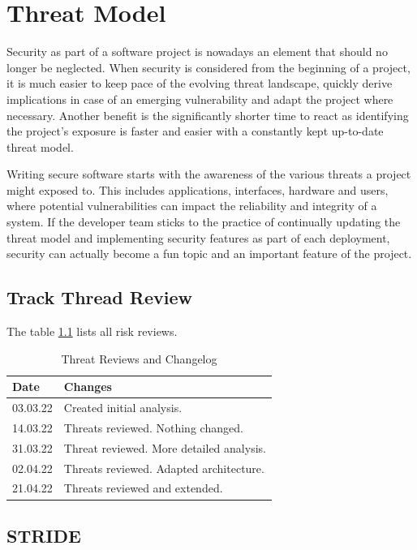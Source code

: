 \chapter{Threat Model}

Security as part of a software project is nowadays an element that should no longer be neglected. When security is considered from the beginning of a project, it is much easier to keep pace of the evolving threat landscape, quickly derive implications in case of an emerging vulnerability and adapt the project where necessary. Another benefit is the significantly shorter time to react as identifying the project's exposure is faster and easier with a constantly kept up-to-date threat model.

Writing secure software starts with the awareness of the various threats a project might exposed to. This includes applications, interfaces, hardware and users, where potential vulnerabilities can impact the reliability and integrity of a system. If the developer team sticks to the practice of continually updating the threat model and implementing security features as part of each deployment, security can actually become a fun topic and an important feature of the project.

\section{Track Thread Review}
The table \ref{tab:threat-review} lists all risk reviews.

\begin{table}[h!]
  \centering
  \caption{\label{tab:threat-review}Threat Reviews and Changelog}
  \begin{tabular}{ | l | l | }
    \hline
    \textbf{Date} & \textbf{Changes} \\
    \hline
    03.03.22 & Created initial analysis. \\
    \hline
    14.03.22 & Threats reviewed. Nothing changed. \\
    \hline
    31.03.22 & Threat reviewed. More detailed analysis. \\
    \hline
    02.04.22 & Threats reviewed. Adapted architecture.\\
    \hline
    21.04.22 & Threats reviewed and extended.\\
    \hline
  \end{tabular}
\end{table}

\section{STRIDE}

